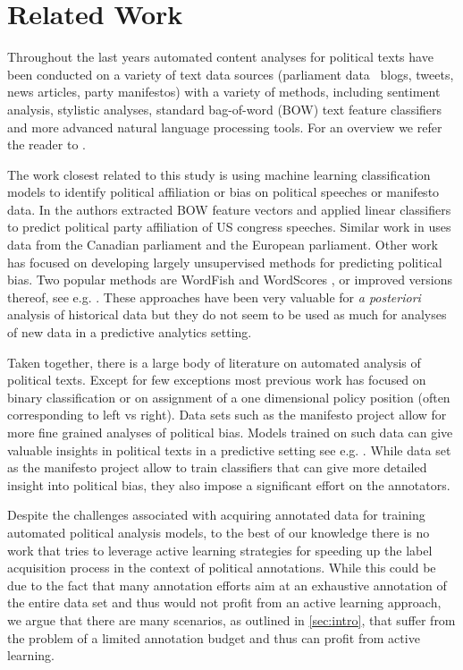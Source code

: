 \documentclass[runningheads,a4paper]{article}
\begin{document}
\section{Related Work}\label{sec:related}

Throughout the last years automated content analyses for political texts have been conducted on a variety of text data sources (parliament data \, blogs, tweets, news articles, party manifestos) with a variety of methods, including sentiment analysis, stylistic analyses, standard bag-of-word (BOW) text feature classifiers and more advanced natural language processing tools. For an overview we refer the reader to \cite{Grimmer2013,Kaal2014}. 

The work closest related to this study is using machine learning classification models to identify political affiliation or bias on political speeches or manifesto data. In \cite{Yu2008} the authors extracted BOW feature vectors and applied linear classifiers to predict political party affiliation of US congress speeches. Similar work in \cite{Hirst2014} uses data from the Canadian parliament and the European parliament. 
Other work has focused on developing largely unsupervised methods for predicting political bias. Two popular methods are WordFish \cite{Slapin08ascaling} and WordScores \cite{Laver2003}, or improved versions thereof, see e.g. \cite{Lowe09scalingpolicy}. These approaches have been very valuable for {\em a posteriori} analysis of historical data but they do not seem to be used as much for analyses of new data in a predictive analytics setting. 

Taken together, there is a large body of literature on automated analysis of political texts. Except for few exceptions most previous work has focused on binary classification or on assignment of a one dimensional policy position (often corresponding to left vs right). Data sets such as the manifesto project allow for more fine grained analyses of political bias. Models trained on such data can give valuable insights in political texts in a predictive setting see e.g. \cite{Merz2016,Biessmann16}. While data set as the manifesto project allow to train classifiers that can give more detailed insight into political bias, they also impose a significant effort on the annotators. 

Despite the challenges associated with acquiring annotated data for training automated political analysis models, to the best of our knowledge there is no work that tries to leverage active learning strategies for speeding up the label acquisition process in the context of political annotations. While this could be due to the fact that many annotation efforts aim at an exhaustive annotation of the entire data set and thus would not profit from an active learning approach, we argue that there are many scenarios, as outlined in \autoref{sec:intro}, that suffer from the problem of a limited annotation budget and thus can profit from active learning.
\end{document}
